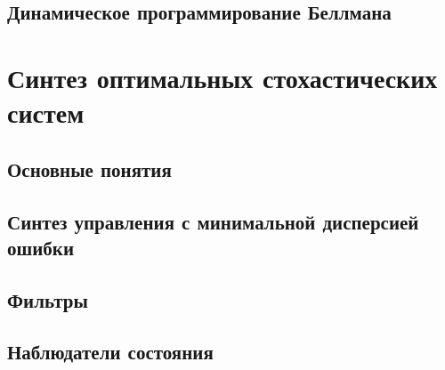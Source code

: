 \documentclass[preprint,russian,a5paper,10pt,twoside]{ncc}
\begin{document}
 \subsection{Динамическое программирование Беллмана\label{synthesis:dyn_prog}}
  
  \clearpage
  \section{Синтез оптимальных стохастических систем\label{stochastic}}
 \subsection{Основные понятия\label{stochastic:general}}
 
 \subsection{Синтез управления с минимальной дисперсией ошибки\label{stochastic:min_error_dispersion}}
 
 \subsection{Фильтры\label{stochastic:filters}}
 
 \subsection{Наблюдатели состояния\label{stochastic:observers}}
\end{document}
